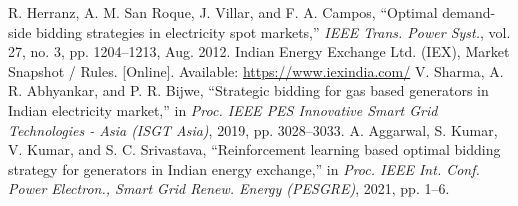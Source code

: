\documentclass[conference]{IEEEtran}
\begin{document}
\begin{thebibliography}{99}
 R. Herranz, A. M. San Roque, J. Villar, and F. A. Campos, “Optimal demand-side bidding strategies in electricity spot markets,” \textit{IEEE Trans. Power Syst.}, vol. 27, no. 3, pp. 1204–1213, Aug. 2012.
 Indian Energy Exchange Ltd. (IEX), Market Snapshot / Rules. [Online]. Available: \url{https://www.iexindia.com/} %
 V. Sharma, A. R. Abhyankar, and P. R. Bijwe, “Strategic bidding for gas based generators in Indian electricity market,” in \textit{Proc. IEEE PES Innovative Smart Grid Technologies - Asia (ISGT Asia)}, 2019, pp. 3028–3033. 
 A. Aggarwal, S. Kumar, V. Kumar, and S. C. Srivastava, “Reinforcement learning based optimal bidding strategy for generators in Indian energy exchange,” in \textit{Proc. IEEE Int. Conf. Power Electron., Smart Grid Renew. Energy (PESGRE)}, 2021, pp. 1–6. 


\end{thebibliography}
\end{document}
